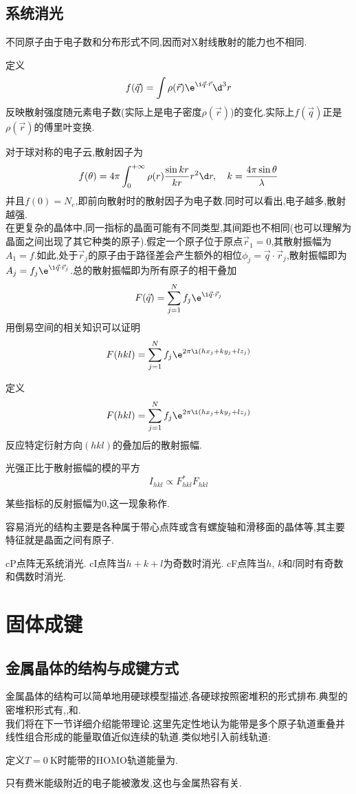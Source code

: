 \documentclass{ctexbook}
\begin{document}
\subsection{系统消光}
不同原子由于电子数和分布形式不同,因而对X射线散射的能力也不相同.
\begin{definition}[散射因子]
    定义
    \[f(\vec{q})=\int\rho(\vec{r})\e^{\i\vec{q}\cdot\vec{r}}\d^3r\]
    反映散射强度随元素电子数(实际上是电子密度$\rho(\vec{r})$)的变化.实际上$f(\vec{q})$正是$\rho(\vec{r})$的傅里叶变换.
\end{definition}
对于球对称的电子云,散射因子为
\[f(\theta)=4\pi\int_0^{+\infty}\rho(r)\dfrac{\sin kr}{kr}r^2\d r,\quad k=\dfrac{4\pi\sin\theta}{\lambda}\]
并且$f(0)=N_{e}$,即前向散射时的散射因子为电子数.同时可以看出,电子越多,散射越强.\\
\indent 在更复杂的晶体中,同一指标的晶面可能有不同类型,其间距也不相同(也可以理解为晶面之间出现了其它种类的原子).假定一个原子位于原点$\vec{r}_1=0$,其散射振幅为$A_1=f$.如此,处于$\vec{r}_j$的原子由于路径差会产生额外的相位$\phi_j=\vec{q}\cdot\vec{r}_j$,散射振幅即为$A_j=f_j\e^{\i\vec{q}\cdot\vec{r}_j}$.总的散射振幅即为所有原子的相干叠加
\[F(\vec{q})=\sum_{j=1}^{N}f_j\e^{\i\vec{q}\cdot\vec{r}_j}\]
用倒易空间的相关知识可以证明
\[F(hkl)=\sum_{j=1}^{N}f_j\e^{2\pi\i(hx_j+ky_j+lz_j)}\]
\begin{definition}[结构因子]
    定义
    \[F(hkl)=\sum_{j=1}^{N}f_j\e^{2\pi\i(hx_j+ky_j+lz_j)}\]
    反应特定衍射方向$(hkl)$的叠加后的散射振幅.
\end{definition}
光强正比于散射振幅的模的平方
\[I_{hkl}\propto F_{hkl}^\ast F_{hkl}\]
\begin{definition}[系统消光]
    某些指标的反射振幅为$0$,这一现象称作.
\end{definition}
容易消光的结构主要是各种属于带心点阵或含有螺旋轴和滑移面的晶体等,其主要特征就是晶面之间有原子.
\begin{theorem}[立方晶系的系统消光条件]
    cP点阵无系统消光. cI点阵当$h+k+l$为奇数时消光. cF点阵当$h$, $k$和$l$同时有奇数和偶数时消光.
\end{theorem}
\section{固体成键}
\subsection{金属晶体的结构与成键方式}
金属晶体的结构可以简单地用硬球模型描述,各硬球按照密堆积的形式排布.典型的密堆积形式有,,和.\\
\indent 我们将在下一节详细介绍能带理论.这里先定性地认为能带是多个原子轨道重叠并线性组合形成的能量取值近似连续的轨道.类似地引入前线轨道:
\begin{definition}[费米能级]
    定义$T=\SI{0}{\kelvin}$时能带的HOMO轨道能量为.
\end{definition}
只有费米能级附近的电子能被激发,这也与金属热容有关.
\end{document}
